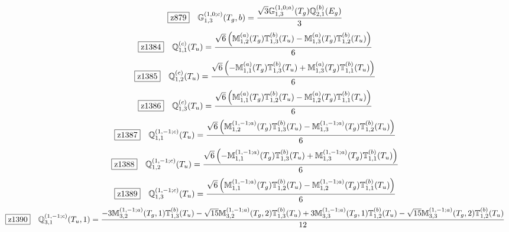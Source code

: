 \documentclass[fleqn,10pt,landscape]{jsarticle}
\begin{document}
\begin{dmath*}
\hspace*{3mm}\fbox{z879}\quad \mathbb{G}_{1,3}^{(1,0;c)}(T_{g},b)=\frac{\sqrt{3} \mathbb{G}_{1,3}^{(1,0;a)}(T_{g}) \mathbb{Q}_{2,1}^{(b)}(E_{g})}{3}
\end{dmath*}
\begin{dmath*}
\hspace*{3mm}\fbox{z1384}\quad \mathbb{Q}_{1,1}^{(c)}(T_{u})=\frac{\sqrt{6} \left(\mathbb{M}_{1,2}^{(a)}(T_{g}) \mathbb{T}_{1,3}^{(b)}(T_{u}) - \mathbb{M}_{1,3}^{(a)}(T_{g}) \mathbb{T}_{1,2}^{(b)}(T_{u})\right)}{6}
\end{dmath*}
\begin{dmath*}
\hspace*{3mm}\fbox{z1385}\quad \mathbb{Q}_{1,2}^{(c)}(T_{u})=\frac{\sqrt{6} \left(- \mathbb{M}_{1,1}^{(a)}(T_{g}) \mathbb{T}_{1,3}^{(b)}(T_{u}) + \mathbb{M}_{1,3}^{(a)}(T_{g}) \mathbb{T}_{1,1}^{(b)}(T_{u})\right)}{6}
\end{dmath*}
\begin{dmath*}
\hspace*{3mm}\fbox{z1386}\quad \mathbb{Q}_{1,3}^{(c)}(T_{u})=\frac{\sqrt{6} \left(\mathbb{M}_{1,1}^{(a)}(T_{g}) \mathbb{T}_{1,2}^{(b)}(T_{u}) - \mathbb{M}_{1,2}^{(a)}(T_{g}) \mathbb{T}_{1,1}^{(b)}(T_{u})\right)}{6}
\end{dmath*}
\begin{dmath*}
\hspace*{3mm}\fbox{z1387}\quad \mathbb{Q}_{1,1}^{(1,-1;c)}(T_{u})=\frac{\sqrt{6} \left(\mathbb{M}_{1,2}^{(1,-1;a)}(T_{g}) \mathbb{T}_{1,3}^{(b)}(T_{u}) - \mathbb{M}_{1,3}^{(1,-1;a)}(T_{g}) \mathbb{T}_{1,2}^{(b)}(T_{u})\right)}{6}
\end{dmath*}
\begin{dmath*}
\hspace*{3mm}\fbox{z1388}\quad \mathbb{Q}_{1,2}^{(1,-1;c)}(T_{u})=\frac{\sqrt{6} \left(- \mathbb{M}_{1,1}^{(1,-1;a)}(T_{g}) \mathbb{T}_{1,3}^{(b)}(T_{u}) + \mathbb{M}_{1,3}^{(1,-1;a)}(T_{g}) \mathbb{T}_{1,1}^{(b)}(T_{u})\right)}{6}
\end{dmath*}
\begin{dmath*}
\hspace*{3mm}\fbox{z1389}\quad \mathbb{Q}_{1,3}^{(1,-1;c)}(T_{u})=\frac{\sqrt{6} \left(\mathbb{M}_{1,1}^{(1,-1;a)}(T_{g}) \mathbb{T}_{1,2}^{(b)}(T_{u}) - \mathbb{M}_{1,2}^{(1,-1;a)}(T_{g}) \mathbb{T}_{1,1}^{(b)}(T_{u})\right)}{6}
\end{dmath*}
\begin{dmath*}
\hspace*{3mm}\fbox{z1390}\quad \mathbb{Q}_{3,1}^{(1,-1;c)}(T_{u},1)=\frac{- 3 \mathbb{M}_{3,2}^{(1,-1;a)}(T_{g},1) \mathbb{T}_{1,3}^{(b)}(T_{u}) - \sqrt{15} \mathbb{M}_{3,2}^{(1,-1;a)}(T_{g},2) \mathbb{T}_{1,3}^{(b)}(T_{u}) + 3 \mathbb{M}_{3,3}^{(1,-1;a)}(T_{g},1) \mathbb{T}_{1,2}^{(b)}(T_{u}) - \sqrt{15} \mathbb{M}_{3,3}^{(1,-1;a)}(T_{g},2) \mathbb{T}_{1,2}^{(b)}(T_{u})}{12}
\end{dmath*}
\end{document}
